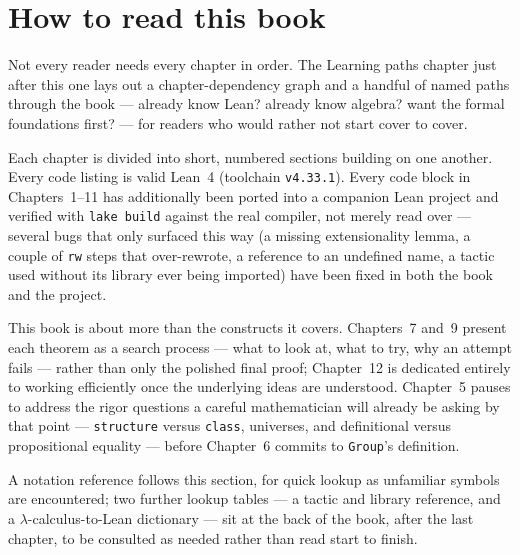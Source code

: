 \chapter*{How to read this book}

Not every reader needs every chapter in order. The Learning paths chapter
just after this one lays out a chapter-dependency graph and a handful of
named paths through the book --- already know Lean? already know algebra?
want the formal foundations first? --- for readers who would rather not
start cover to cover.

Each chapter is divided into short, numbered sections building on one
another. Every code listing is valid Lean~4 (toolchain
\texttt{v4.33.1}). Every code block in Chapters~1--11 has additionally
been ported into a companion Lean project and verified with
\texttt{lake build} against the real compiler, not merely read over ---
several bugs that only surfaced this way (a missing extensionality
lemma, a couple of \texttt{rw} steps that over-rewrote, a reference to an
undefined name, a tactic used without its library ever being imported)
have been fixed in both the book and the project.

This book is about more than the constructs it covers. Chapters~7 and~9
present each theorem as a search process --- what to look at, what to
try, why an attempt fails --- rather than only the polished final proof;
Chapter~12 is dedicated entirely to working efficiently once the
underlying ideas are understood. Chapter~5 pauses to address the rigor
questions a careful mathematician will already be asking by that point
--- \texttt{structure} versus \texttt{class}, universes, and definitional
versus propositional equality --- before Chapter~6 commits to
\texttt{Group}'s definition.

A notation reference follows this section, for quick lookup as unfamiliar
symbols are encountered; two further lookup tables --- a tactic and
library reference, and a $\lambda$-calculus-to-Lean dictionary --- sit at
the back of the book, after the last chapter, to be consulted as needed
rather than read start to finish.

\tableofcontents
